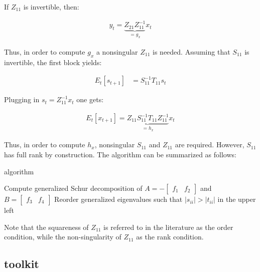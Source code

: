 \documentclass{pracamgr}
\numberwithin{equation}{section}
\begin{document}
If $Z_{11}$ is invertible, then:

\begin{align}
  y_t = \underbrace{Z_{21} Z_{11}^{-1}}_{=g_x} x_t
\end{align}

Thus, in order to compute $g_x$ a nonsingular $Z_{11}$ is needed. Assuming  that $S_{11}$ is invertible, the first block yields:

\begin{align}
   E_t[s_{t+1}] &= S_{11}^{-1} T_{11} s_t
\end{align}

Plugging in $s_t = Z_{11}^{-1} x_t$ one gets:

\begin{align}
   E_t[ x_{t+1}] = \underbrace{Z_{11} S_{11}^{-1} T_{11} Z_{11}^{-1}}_{=h_x} x_t
\end{align}

Thus, in order to compute $h_x$, nonsingular $S_{11}$ and $Z_{11}$ are required. However, $S_{11}$ has full rank by construction. The \citet{klein2000using} algorithm can be summarized as follows: \\

\begin{algorithm}[H]
\caption{\citet{klein2000using} algorithm}
Compute generalized Schur decomposition of $A=-\begin{bmatrix} f_1 & f_2\end{bmatrix}$ and $B=\begin{bmatrix} f_3 & f_4\end{bmatrix}$\;
Reorder generalized eigenvalues such that $|s_{ii}|>|t_{ii}|$ in the upper left\;
\end{algorithm}

\bigbreak

Note that the squareness of $Z_{11}$ is referred to in the literature as the \citet{blanchard1980solution} order condition, while the non-singularity of $Z_{11}$ as the \citet{blanchard1980solution} rank condition.

\subsection{\citet{uhlig1998toolkit} toolkit}
\end{document}
